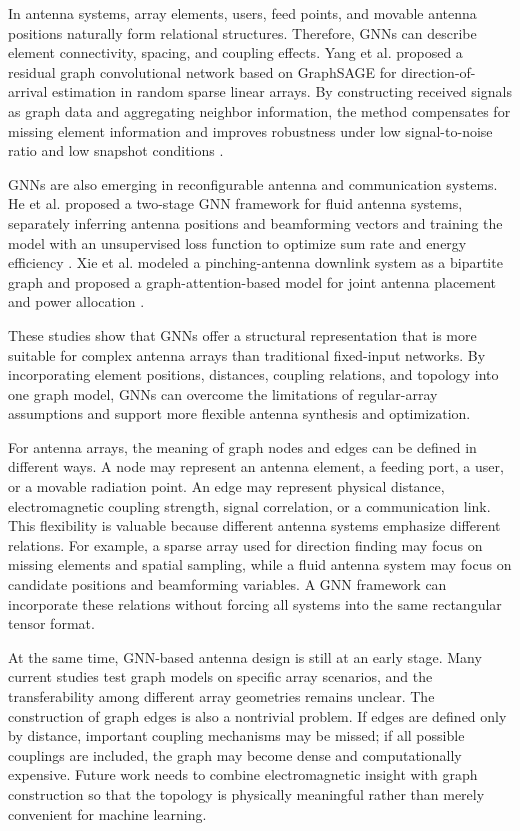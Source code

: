 \documentclass{article}
\begin{document}
In antenna systems, array elements, users, feed points, and movable antenna positions naturally form relational structures. Therefore, GNNs can describe element connectivity, spacing, and coupling effects. Yang et al. proposed a residual graph convolutional network based on GraphSAGE for direction-of-arrival estimation in random sparse linear arrays. By constructing received signals as graph data and aggregating neighbor information, the method compensates for missing element information and improves robustness under low signal-to-noise ratio and low snapshot conditions \cite{yang2024doa}.

GNNs are also emerging in reconfigurable antenna and communication systems. He et al. proposed a two-stage GNN framework for fluid antenna systems, separately inferring antenna positions and beamforming vectors and training the model with an unsupervised loss function to optimize sum rate and energy efficiency \cite{he2025fluid}. Xie et al. modeled a pinching-antenna downlink system as a bipartite graph and proposed a graph-attention-based model for joint antenna placement and power allocation \cite{xie2025pinching}.

These studies show that GNNs offer a structural representation that is more suitable for complex antenna arrays than traditional fixed-input networks. By incorporating element positions, distances, coupling relations, and topology into one graph model, GNNs can overcome the limitations of regular-array assumptions and support more flexible antenna synthesis and optimization.

For antenna arrays, the meaning of graph nodes and edges can be defined in different ways. A node may represent an antenna element, a feeding port, a user, or a movable radiation point. An edge may represent physical distance, electromagnetic coupling strength, signal correlation, or a communication link. This flexibility is valuable because different antenna systems emphasize different relations. For example, a sparse array used for direction finding may focus on missing elements and spatial sampling, while a fluid antenna system may focus on candidate positions and beamforming variables. A GNN framework can incorporate these relations without forcing all systems into the same rectangular tensor format.

At the same time, GNN-based antenna design is still at an early stage. Many current studies test graph models on specific array scenarios, and the transferability among different array geometries remains unclear. The construction of graph edges is also a nontrivial problem. If edges are defined only by distance, important coupling mechanisms may be missed; if all possible couplings are included, the graph may become dense and computationally expensive. Future work needs to combine electromagnetic insight with graph construction so that the topology is physically meaningful rather than merely convenient for machine learning.
\end{document}
